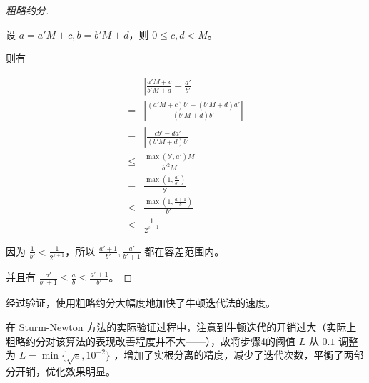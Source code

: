 \begin{proof}[粗略约分]~
	
	设 $a = a' M + c, b = b' M + d$，则 $0 \leq c, d < M$。
	
	则有
	
	$$
	\begin{aligned}
		& \left|\frac{a'M + c}{b'M + d} - \frac{a'}{b'}\right| \\
		= & \left|\frac{(a'M + c)b' - (b'M + d)a'}{(b'M + d)b'}\right| \\
		= & \left|\frac{cb' - da'}{(b'M + d)b'}\right| \\
		\leq & \frac{\max(b', a')M}{b'^2M} \\
		= & \frac{\max(1, \frac{a'}{b'})}{b'} \\
		< & \frac{\max(1, \frac{a + 1}{b})}{b'} \\
		< & \frac{1}{2^{\varepsilon + 1}}
	\end{aligned}
	$$
	
	因为 $\frac{1}{b'} < \frac{1}{2^{\varepsilon + 1}}$，所以 $\frac{a' + 1}{b'}, \frac{a'}{b' + 1}$ 都在容差范围内。
	
	并且有 $\frac{a'}{b' + 1} \leq \frac{a}{b} \leq \frac{a' + 1}{b'}$。
	
	\qedhere
	
	
\end{proof}

经过验证，使用粗略约分大幅度地加快了牛顿迭代法的速度。


在 Sturm-Newton 方法的实际验证过程中，注意到牛顿迭代的开销过大（实际上粗略约分对该算法的表现改善程度并不大——），故将步骤4的阈值 $L$ 从 $0.1$ 调整为 $L = \min\{\sqrt e, 10^{-2}\}$ ，增加了实根分离的精度，减少了迭代次数，平衡了两部分开销，优化效果明显。

